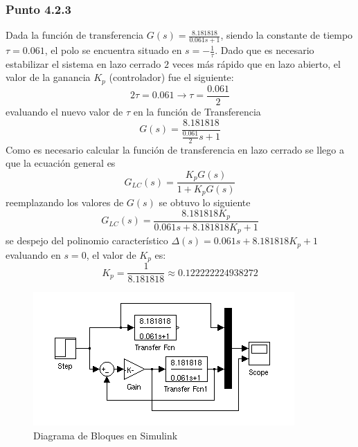 \documentclass[twocolumn]{IEEEtran}
\begin{document}
\subsubsection{Punto 4.2.3}
\noindent
Dada la función de transferencia $G(s)=\frac{8.181818}{0.061s+1}$, siendo la constante de tiempo $\tau=0.061$, el polo se encuentra situado en $s=-\frac{1}{\tau}$. Dado que es necesario estabilizar el sistema en lazo cerrado $2$ veces más rápido que en lazo abierto, el valor de la ganancia $K_p$ (controlador) fue el siguiente:
$$ 2\tau=0.061 \rightarrow \tau=\frac{0.061}{2} $$
\noindent
evaluando el nuevo valor de $\tau$ en la función de Transferencia
\begin{equation}
 G(s)=\frac{8.181818}{\frac{0.061}{2}s+1}
\label{ecu1}
\end{equation}
\noindent
Como es necesario calcular la función de transferencia en lazo cerrado se llego a que la ecuación general es
$$ G_{LC} \left( s \right) = \frac{{K_p G\left( s \right) }}{{1 + K_p G\left( s \right) }} $$
\noindent
reemplazando los valores de $G\left( s \right)$ se obtuvo lo siguiente
\begin{equation}
 G_{LC} \left( s \right) = \frac{{8.181818 K_p }}{{0.061s + 8.181818 K_p + 1}}
\label{ecu2}
\end{equation}
\noindent
se despejo del polinomio característico $\Delta\left( s \right)=0.061s + 8.181818 K_p + 1$ evaluando en $s=0$, el valor de $K_p$ es:
\begin{equation*}
 K_p=\frac{1}{8.181818}\approx 0.122222224938272
\end{equation*}
\begin{figure}[H]
	\centering
		\includegraphics[scale=1]{figure1.png}
	\caption{Diagrama de Bloques en Simulink}
	\label{fig1}
\end{figure}
\end{document}
